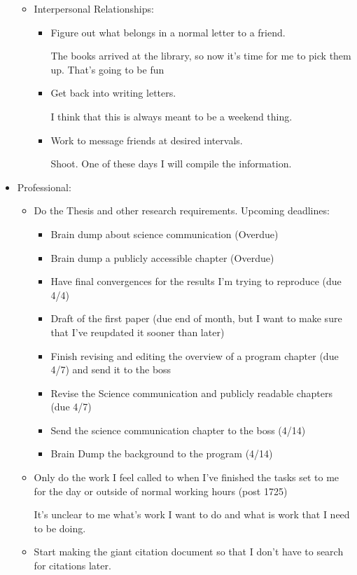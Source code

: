 \documentclass[12pt]{article}[titlepage]
\renewcommand{\,}{\textsuperscript{,}}
\begin{document}
\begin{itemize}
\begin{itemize}
\item Interpersonal Relationships:  
\begin{itemize}   
\item Figure out what belongs in a normal letter to a friend.  
  
The books arrived at the library, so now it's time for me to pick them up.  
That's going to be fun  
\item Get back into writing letters.

I think that this is always meant to be a weekend thing.  
\item Work to message friends at desired intervals.

Shoot. One of these days I will compile the information.  
\end{itemize}

\end{itemize}  
\item Professional:   
\begin{itemize}   
\item Do the Thesis and other research requirements. Upcoming deadlines:  
\begin{itemize}  
\item Brain dump about science communication (Overdue)  
\item Brain dump a publicly accessible chapter (Overdue)  
\item Have final convergences for the results I'm trying to reproduce (due 4/4)  
\item Draft of the first paper (due end of month, but I want to make sure that I've reupdated it sooner than later)  
\item Finish revising and editing the overview of a program chapter (due 4/7) and send it to the boss  
\item Revise the Science communication and publicly readable chapters (due 4/7)  
\item Send the science communication chapter to the boss (4/14)  
\item Brain Dump the background to the program (4/14)  
\end{itemize}  
\item Only do the work I feel called to when I've finished the tasks set to me for the day or outside of normal working hours (post 1725)

It's unclear to me what's work I want to do and what is work that I need to be doing.  
\item Start making the giant citation document so that I don't have to search for citations later.  
  

\end{itemize}
\end{itemize}
\end{document}
